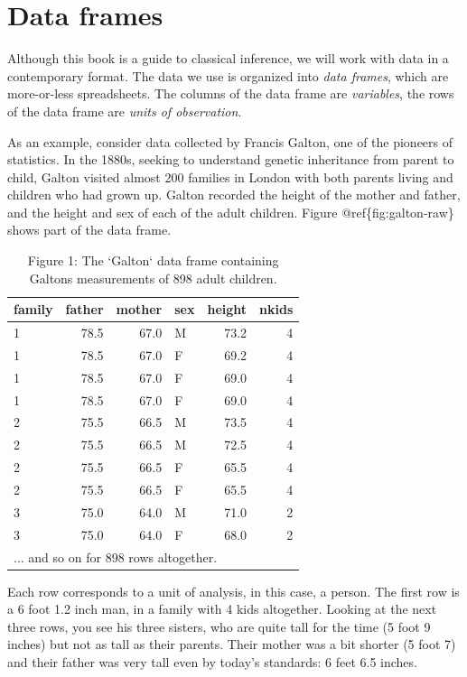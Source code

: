 \documentclass[]{book}
\begin{document}
\hypertarget{data-frames}{%
\section{Data frames}\label{data-frames}}

Although this book is a guide to classical inference, we will work with data in a contemporary format. The data we use is organized into \emph{data frames}, which are more-or-less spreadsheets. The columns of the data frame are \emph{variables}, the rows of the data frame are \emph{units of observation}.

As an example, consider data collected by Francis Galton, one of the pioneers of statistics. In the 1880s, seeking to understand genetic inheritance from parent to child, Galton visited almost 200 families in London with both parents living and children who had grown up. Galton recorded the height of the mother and father, and the height and sex of each of the adult children. Figure @ref\{fig:galton-raw\} shows part of the data frame.

\begin{table}[t]

\caption{\label{tab:unnamed-chunk-2}Figure 1: The `Galton` data frame containing Galtons measurements of 898 adult children.}
\centering
\begin{tabular}{l|r|r|l|r|r}
\hline
family & father & mother & sex & height & nkids\\
\hline
1 & 78.5 & 67.0 & M & 73.2 & 4\\
\hline
1 & 78.5 & 67.0 & F & 69.2 & 4\\
\hline
1 & 78.5 & 67.0 & F & 69.0 & 4\\
\hline
1 & 78.5 & 67.0 & F & 69.0 & 4\\
\hline
2 & 75.5 & 66.5 & M & 73.5 & 4\\
\hline
2 & 75.5 & 66.5 & M & 72.5 & 4\\
\hline
2 & 75.5 & 66.5 & F & 65.5 & 4\\
\hline
2 & 75.5 & 66.5 & F & 65.5 & 4\\
\hline
3 & 75.0 & 64.0 & M & 71.0 & 2\\
\hline
3 & 75.0 & 64.0 & F & 68.0 & 2\\
\hline
\multicolumn{6}{l}{... and so on for 898 rows altogether.}\\
\end{tabular}
\end{table}

Each row corresponds to a unit of analysis, in this case, a person. The first row is a 6 foot 1.2 inch man, in a family with 4 kids altogether. Looking at the next three rows, you see his three sisters, who are quite tall for the time (5 foot 9 inches) but not as tall as their parents. Their mother was a bit shorter (5 foot 7) and their father was very tall even by today's standards: 6 feet 6.5 inches.
\end{document}
